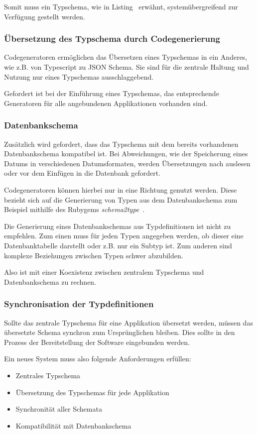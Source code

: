 Somit muss ein Typschema, wie in Listing~ erwähnt, systemübergreifend zur Verfügung gestellt werden.

\subsubsection{Übersetzung des Typschema durch Codegenerierung}
Codegeneratoren ermöglichen das Übersetzen eines Typschemas in ein Anderes, wie z.B. von Typescript zu JSON Schema.
Sie sind für die zentrale Haltung und Nutzung nur eines Typschemas ausschlaggebend.

Gefordert ist bei der Einführung eines Typschemas, das entsprechende Generatoren für alle angebundenen Applikationen vorhanden sind.

\subsubsection{Datenbankschema}
Zusätzlich wird gefordert, dass das Typschema mit dem bereits vorhandenen Datenbankschema kompatibel ist.
Bei Abweichungen, wie der Speicherung eines Datums in verschiedenen Datumsformaten,
werden Übersetzungen nach auslesen oder vor dem Einfügen in die Datenbank gefordert.

Codegeneratoren können hierbei nur in eine Richtung genutzt werden.
Diese bezieht sich auf die Generierung von Typen aus dem Datenbankschema zum Beispiel mithilfe des Rubygems \emph{schema2type}~\cite{schema2type}.

Die Generierung eines Datenbankschemas aus Typdefinitionen ist nicht zu empfehlen.
Zum einen muss für jeden Typen angegeben werden, ob dieser eine Datenbanktabelle darstellt oder z.B. nur ein Subtyp ist.
Zum anderen sind komplexe Beziehungen zwischen Typen schwer abzubilden.

Also ist mit einer Koexistenz zwischen zentralem Typschema und Datenbankschema zu rechnen.

\subsubsection{Synchronisation der Typdefinitionen}
Sollte das zentrale Typschema für eine Applikation übersetzt werden,
müssen das übersetzte Schema synchron zum Ursprünglichen bleiben. Dies sollte in den Prozess der Bereitstellung der Software eingebunden werden.

Ein neues System muss also folgende Anforderungen erfüllen:

\begin{itemize}
    \setlength\itemsep{-1em}
    \item Zentrales Typschema
    \item Übersetzung des Typschemas für jede Applikation
    \item Synchronität aller Schemata
    \item Kompatibilität mit Datenbankschema
\end{itemize}

